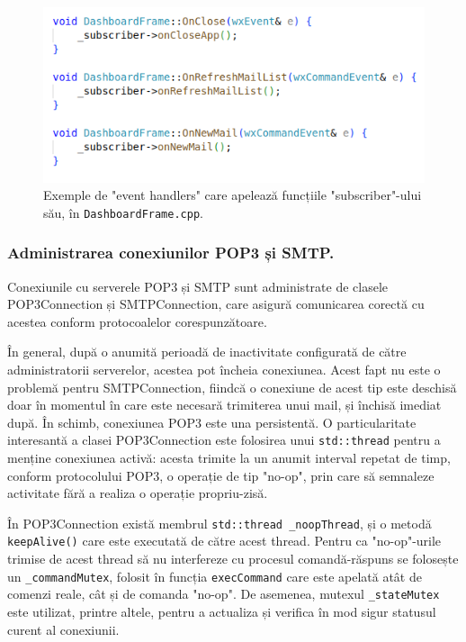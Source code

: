 \documentclass[runningheads]{llncs}
\begin{document}
\begin{figure}
    \centering
    \includegraphics[width=\textwidth]{subscriberFxns.png}
    \caption{Exemple de "event handlers" care apelează funcțiile "subscriber"-ului său, în \texttt{DashboardFrame.cpp}.}
    \label{fig:subscriberFxns}
\end{figure}

\subsubsection{Administrarea conexiunilor POP3 și SMTP.}

Conexiunile cu serverele POP3 și SMTP sunt administrate de clasele POP3Connection și SMTPConnection, care asigură comunicarea corectă cu acestea conform protocoalelor corespunzătoare. 

În general, după o anumită perioadă de inactivitate configurată de către administratorii serverelor, acestea pot încheia conexiunea. Acest fapt nu este o problemă pentru SMTPConnection, fiindcă o conexiune de acest tip este deschisă doar în momentul în care este necesară trimiterea unui mail, și închisă imediat după. În schimb, conexiunea POP3 este una persistentă. O particularitate interesantă a clasei POP3Connection este folosirea unui \texttt{std::thread} pentru a menține conexiunea activă: acesta trimite la un anumit interval repetat de timp, conform protocolului POP3, o operație de tip "no-op", prin care să semnaleze activitate fără a realiza o operație propriu-zisă.

În POP3Connection există membrul \texttt{std::thread \_noopThread}, și o metodă \texttt{keepAlive()} care este executată de către acest thread. Pentru ca "no-op"-urile trimise de acest thread să nu interfereze cu procesul comandă-răspuns se folosește un \texttt{\_commandMutex}, folosit în funcția \texttt{execCommand} care este apelată atât de comenzi reale, cât și de comanda "no-op". De asemenea, mutexul \texttt{\_stateMutex} este utilizat, printre altele, pentru a actualiza și verifica în mod sigur statusul curent al conexiunii.
\end{document}
